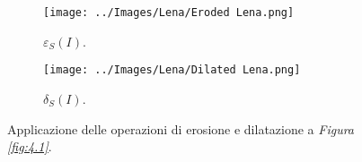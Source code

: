 \documentclass{subfiles}
\begin{document}
\begin{figure}[!h]
    \centering
    \begin{subfigure}[b]{0.425\textwidth}
        \centering
        \texttt{[image: ../Images/Lena/Eroded Lena.png]}
        \caption{\(\varepsilon_{S}(I)\).}
    \end{subfigure}
    \hspace{10pt}
    \begin{subfigure}[b]{0.425\textwidth}
        \centering
        \texttt{[image: ../Images/Lena/Dilated Lena.png]}
        \caption{\(\delta_{S}(I)\).}
    \end{subfigure}
    \caption{Applicazione delle operazioni di erosione e dilatazione a \emph{Figura \ref{fig:4.1}}.}
    \label{fig:7.1}
\end{figure}
\end{document}
